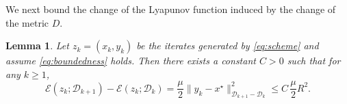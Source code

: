 \documentclass{article}
\theoremstyle{plain}
\newtheorem{lemma}{Lemma}
\newtheorem{assumption}{Assumption}
\theoremstyle{remark}
\begin{document}





We next bound the change of the Lyapunov function induced by the change of the metric $D$.

\begin{lemma}
    \label{lem:chenge-D}
Let $z_k=(x_k,y_k)$ be the iterates generated by \eqref{eq:scheme} and assume \eqref{eq:boundedness} holds. Then there exists a constant $C>0$ such that for any $k\ge 1$,
$$
\mathcal{E}(z_k;\mathcal D_{k+1})-\mathcal{E}(z_k;\mathcal D_k)
=\frac{\mu}{2}\|y_k-x^\star\|_{\mathcal D_{k+1}-\mathcal D_k}^2
\le C\,\frac{\mu}{2}R^2.
$$
\end{lemma}
\end{document}
